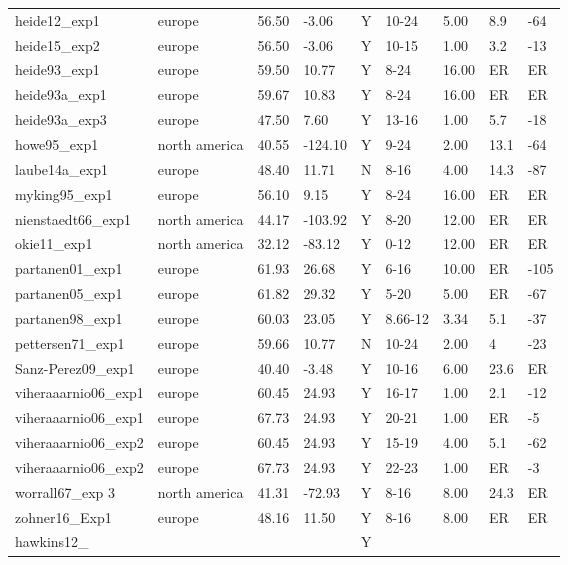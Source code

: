 \documentclass{article}
\begin{document}
\begin{table}[ht]
\begin{tabular}{|p{}|p{}|p{}|p{}|p{}|p{}|p{}|p{}|p{}|}
  heide12\_exp1 & europe & 56.50 & -3.06 & Y & 10-24 & 5.00 & 8.9 & -64 \\ 
  heide15\_exp2 & europe & 56.50 & -3.06 & Y & 10-15 & 1.00 & 3.2 & -13 \\ 
  heide93\_exp1 & europe & 59.50 & 10.77 & Y & 8-24 & 16.00 & ER & ER \\ 
  heide93a\_exp1 & europe & 59.67 & 10.83 & Y & 8-24 & 16.00 & ER & ER \\ 
  heide93a\_exp3 & europe & 47.50 & 7.60 & Y & 13-16 & 1.00 & 5.7 & -18 \\ 
  howe95\_exp1 & north america & 40.55 & -124.10 & Y & 9-24 & 2.00 & 13.1 & -64 \\ 
  laube14a\_exp1 & europe & 48.40 & 11.71 & N & 8-16 & 4.00 & 14.3 & -87 \\ 
  myking95\_exp1 & europe & 56.10 & 9.15 & Y & 8-24 & 16.00 & ER & ER \\ 
  nienstaedt66\_exp1 & north america & 44.17 & -103.92 & Y & 8-20 & 12.00 & ER & ER \\ 
  okie11\_exp1 & north america & 32.12 & -83.12 & Y & 0-12 & 12.00 & ER & ER \\ 
  partanen01\_exp1 & europe & 61.93 & 26.68 & Y & 6-16 & 10.00 & ER & -105 \\ 
  partanen05\_exp1 & europe & 61.82 & 29.32 & Y & 5-20 & 5.00 & ER & -67 \\ 
  partanen98\_exp1 & europe & 60.03 & 23.05 & Y & 8.66-12 & 3.34 & 5.1 & -37 \\ 
  pettersen71\_exp1 & europe & 59.66 & 10.77 & N & 10-24 & 2.00 & 4 & -23 \\ 
  Sanz-Perez09\_exp1 & europe & 40.40 & -3.48 & Y & 10-16 & 6.00 & 23.6 & ER \\ 
  viheraaarnio06\_exp1 & europe & 60.45 & 24.93 & Y & 16-17 & 1.00 & 2.1 & -12 \\ 
  viheraaarnio06\_exp1 & europe & 67.73 & 24.93 & Y & 20-21 & 1.00 & ER & -5 \\ 
  viheraaarnio06\_exp2 & europe & 60.45 & 24.93 & Y & 15-19 & 4.00 & 5.1 & -62 \\ 
  viheraaarnio06\_exp2 & europe & 67.73 & 24.93 & Y & 22-23 & 1.00 & ER & -3 \\ 
  worrall67\_exp 3 & north america & 41.31 & -72.93 & Y & 8-16 & 8.00 & 24.3 & ER \\ 
  zohner16\_Exp1 & europe & 48.16 & 11.50 & Y & 8-16 & 8.00 & ER & ER \\ 
  hawkins12\_ &  &  &  & Y &  &  &  &  \\ 
   \hline
\end{tabular}
\end{table}\clearpage
\end{document}
